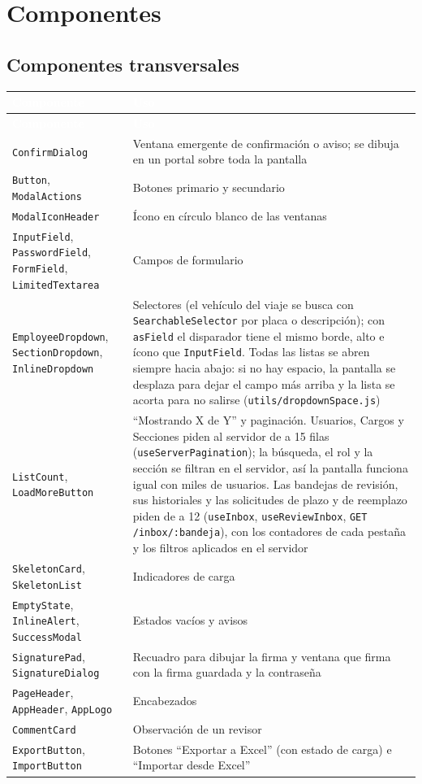 \documentclass[11pt,letterpaper]{article}
\newcommand{\cabecera}{\rowcolor{maxamPrimario}}
\newcommand{\tth}[1]{\textcolor{white}{\textbf{#1}}}
\newcommand{\code}[1]{\nolinkurl{#1}}
\begin{document}
\section{Componentes}

\subsection{Componentes transversales}
\begin{xltabular}{\textwidth}{L{4.2cm} Y}
\cabecera \tth{Componente} & \tth{Uso} \\
\endfirsthead
\cabecera \tth{Componente} & \tth{Uso} \\
\endhead
{} \code{ConfirmDialog} & Ventana emergente de confirmación o aviso; se dibuja en un portal sobre toda la pantalla \\
\code{Button}, \code{ModalActions} & Botones primario y secundario \\
 \code{ModalIconHeader} & Ícono en círculo blanco de las ventanas \\
\code{InputField}, \code{PasswordField}, \code{FormField}, \code{LimitedTextarea} & Campos de formulario \\
 \code{EmployeeDropdown}, \code{SectionDropdown}, \code{InlineDropdown} & Selectores (el vehículo del viaje se busca con \code{SearchableSelector} por placa o descripción); con \code{asField} el disparador tiene el mismo borde, alto e ícono que \code{InputField}. Todas las listas se abren siempre hacia abajo: si no hay espacio, la pantalla se desplaza para dejar el campo más arriba y la lista se acorta para no salirse (\code{utils/dropdownSpace.js}) \\
\code{ListCount}, \code{LoadMoreButton} & ``Mostrando X de Y'' y paginación. Usuarios, Cargos y Secciones piden al servidor de a 15 filas (\code{useServerPagination}); la búsqueda, el rol y la sección se filtran en el servidor, así la pantalla funciona igual con miles de usuarios. Las bandejas de revisión, sus historiales y las solicitudes de plazo y de reemplazo piden de a 12 (\code{useInbox}, \code{useReviewInbox}, \code{GET /inbox/:bandeja}), con los contadores de cada pestaña y los filtros aplicados en el servidor \\
 \code{SkeletonCard}, \code{SkeletonList} & Indicadores de carga \\
\code{EmptyState}, \code{InlineAlert}, \code{SuccessModal} & Estados vacíos y avisos \\
 \code{SignaturePad}, \code{SignatureDialog} & Recuadro para dibujar la firma y ventana que firma con la firma guardada y la contraseña \\
 \code{PageHeader}, \code{AppHeader}, \code{AppLogo} & Encabezados \\
\code{CommentCard} & Observación de un revisor \\
 \code{ExportButton}, \code{ImportButton} & Botones ``Exportar a Excel'' (con estado de carga) e ``Importar desde Excel'' \\
\end{xltabular}
\end{document}
